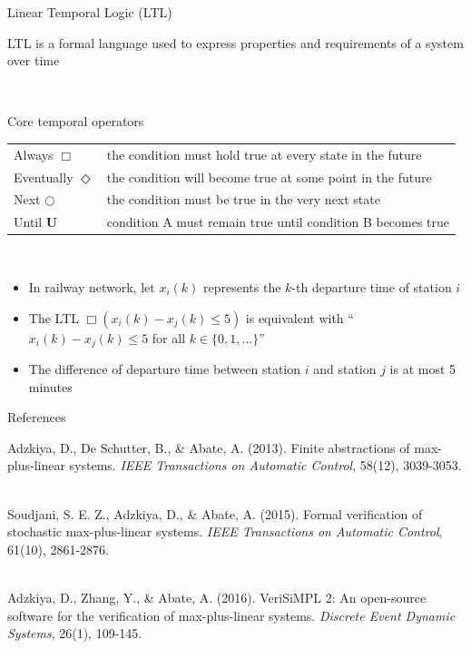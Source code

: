 \documentclass[aspectratio=169]{beamer} %
\begin{document}
	\begin{frame}{Linear Temporal Logic (LTL)}
		
		LTL is a formal language used to express properties and requirements of a system over time
		
		\-\\
		
		\begin{block}{Core temporal operators}
		\begin{tabular}{ll}
			Always $\Box$ & the condition must hold true at every state in the future \\[1ex]
			Eventually $\Diamond$ & the condition will become true at some point in the future \\[1ex]
			Next $\bigcirc$ & the condition must be true in the very next state \\[1ex]
			Until $\mathbf{U}$ & condition A must remain true until condition B becomes true \\[1ex]
		\end{tabular}
		\end{block}
		
		\-\\
		
		\begin{itemize}
			\item In railway network, let $x_i(k)$ represents the $k$-th departure time of station $i$
			
			\item The LTL $\Box (x_i(k) - x_j(k) \leq 5)$ is equivalent with ``$x_i(k) - x_j(k) \leq 5$ for all $k \in \{0,1,\dots\}$''
			
			\item The difference of departure time between station $i$ and station $j$ is at most 5 minutes
		\end{itemize}
		
	\end{frame}
	
	\begin{frame}{References}
		
		Adzkiya, D., De Schutter, B., \& Abate, A. (2013). Finite abstractions of max-plus-linear systems. \textit{IEEE Transactions on Automatic Control}, 58(12), 3039-3053.
		
		\-\\
		
		Soudjani, S. E. Z., Adzkiya, D., \& Abate, A. (2015). Formal verification of stochastic max-plus-linear systems. \textit{IEEE Transactions on Automatic Control}, 61(10), 2861-2876.
		
		\-\\
		
		Adzkiya, D., Zhang, Y., \& Abate, A. (2016). VeriSiMPL 2: An open-source software for the verification of max-plus-linear systems. \textit{Discrete Event Dynamic Systems}, 26(1), 109-145.
		
	\end{frame}
	
\end{document}
